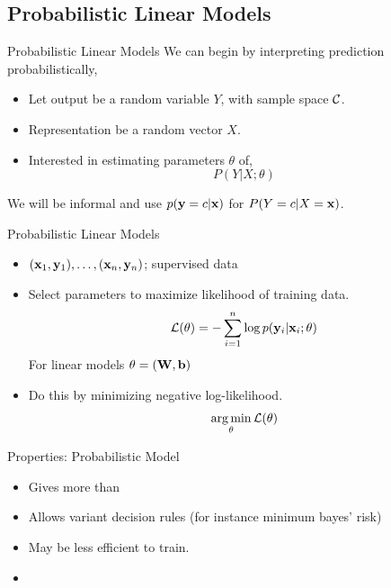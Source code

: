 \documentclass{beamer}
\begin{document}
\subsection{Probabilistic Linear Models}

\begin{frame}{Probabilistic Linear Models} 
  We can begin by interpreting prediction probabilistically,

  \begin{itemize}
  \item Let output be a random variable $Y$, with sample space $\mathcal{C}$. 
  \item Representation be a random vector $X$. 
  \item Interested in estimating parameters $\theta$ of, 
    \[ P(Y | X; \theta) \] 
  \end{itemize}
  We will be informal and use $p(\mathbf{y}=c | \mathbf{x})$ for 
  $P(Y = c | X = \mathbf{x})$.
  
\end{frame}



\begin{frame}{Probabilistic Linear Models} 
  \begin{itemize}
  \item $(\mathbf{x}_1, \mathbf{y}_1), \ldots, (\mathbf{x}_n, \mathbf{y}_n)$; supervised data
  \item Select parameters to maximize likelihood of training data.
    \[ \mathcal{L}(\theta) = - \sum_{i=1}^n \log p(\mathbf{y}_i | \mathbf{x}_i; \theta) \] 
  For linear models $\theta = (\mathbf{W}, \mathbf{b})$ 

  \item Do this by minimizing negative log-likelihood.
    \[ \argmin_\theta \mathcal{L}(\theta)\] 
  \end{itemize}

\end{frame}

\begin{frame}{Properties: Probabilistic Model}
  \begin{itemize}
  \item Gives more than 
  \item Allows variant decision rules (for instance minimum bayes' risk)
  \end{itemize}
  
  \begin{itemize}
  \item May be less efficient to train. 
  \item 
  \end{itemize}
\end{frame}
\end{document}
